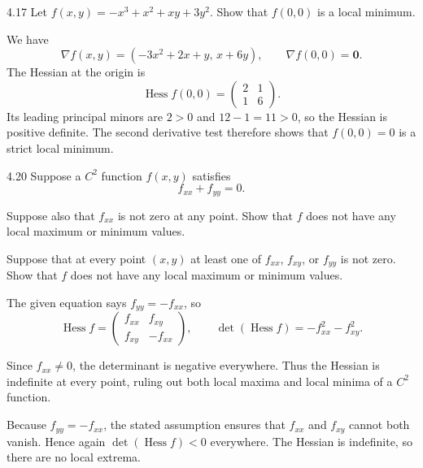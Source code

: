 \documentclass[11pt,oneside]{article}
\begin{document}
\begin{problem}{4.17}
Let $f(x,y)=-x^3+x^2+xy+3y^2$.
Show that $f(0,0)$ is a local minimum.
\end{problem}
\begin{solution}
We have
\[
 \nabla f(x,y)=(-3x^2+2x+y,\,x+6y),
 \qquad \nabla f(0,0)=\mathbf0.
\]
The Hessian at the origin is
\[
 \operatorname{Hess}f(0,0)
 =\begin{pmatrix}2&1\\1&6\end{pmatrix}.
\]
Its leading principal minors are $2>0$ and $12-1=11>0$,
so the Hessian is positive definite. The second derivative test
therefore shows that $\boxed{f(0,0)=0}$ is a strict local minimum.
\end{solution}

\begin{problem}{4.20}
Suppose a $C^2$ function $f(x,y)$ satisfies
\[
 f_{xx}+f_{yy}=0.
\]
\begin{problemsubparts}
\item Suppose also that $f_{xx}$ is not zero at any point.
Show that $f$ does not have any local maximum or minimum values.
\item Suppose that at every point $(x,y)$ at least one of $f_{xx}$,
$f_{xy}$, or $f_{yy}$ is not zero. Show that $f$ does not have any
local maximum or minimum values.
\end{problemsubparts}
\end{problem}
\begin{solution}
The given equation says $f_{yy}=-f_{xx}$, so
\[
 \operatorname{Hess}f=
 \begin{pmatrix}f_{xx}&f_{xy}\\f_{xy}&-f_{xx}\end{pmatrix},
 \qquad
 \det(\operatorname{Hess}f)=-f_{xx}^2-f_{xy}^2.
\]
\begin{problemsubparts}
\item Since $f_{xx}\ne0$, the determinant is negative everywhere.
Thus the Hessian is indefinite at every point, ruling out both
local maxima and local minima of a $C^2$ function.
\item Because $f_{yy}=-f_{xx}$, the stated assumption ensures
that $f_{xx}$ and $f_{xy}$ cannot both vanish. Hence again
$\det(\operatorname{Hess}f)<0$ everywhere. The Hessian is indefinite,
so there are no local extrema.
\end{problemsubparts}
\end{solution}
\end{document}
